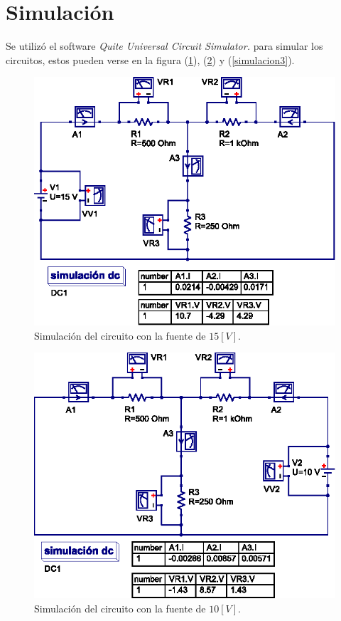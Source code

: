 \documentclass[letter,11pt]{article}
\begin{document}
\section{Simulación}
Se utilizó el software \emph{Quite Universal Circuit Simulator.} para simular
los circuitos, estos pueden verse en la figura (\ref{simulacion1}),
(\ref{simulacion2}) y (\ref{simulacion3}).
\\

\begin{figure}[!h]
\centering
\includegraphics[scale=1.27]{simulation/practica6.1.eps}
\caption{Simulación del circuito con la fuente de $15[V]$.}
\label{simulacion1}
\end{figure}

\begin{figure}[!h]
\centering
\includegraphics[scale=1.27]{simulation/practica6.2.eps}
\caption{Simulación del circuito con la fuente de $10[V]$.}
\label{simulacion2}
\end{figure}
\end{document}
